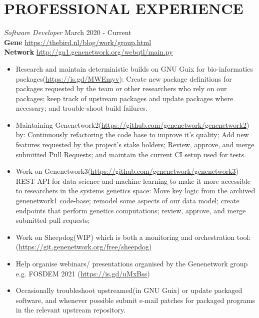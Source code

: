 \documentclass[margin, line]{res} %
\begin{document}


\section{PROFESSIONAL EXPERIENCE}

{\sl Software Developer} \hfill March 2020 - Current \\
\textbf{Gene} \hfill \url{https://thebird.nl/blog/work/group.html} \\
\textbf{Network} \hfill \url{http://gn1.genenetwork.org/webqtl/main.py}

\begin{itemize} \itemsep -2pt
\item Research and maintain deterministic builds on GNU Guix for
  bio-informatics packages(\url{https://is.gd/MWEmyv}): Create new
  package definitions for packages requested by the team or other
  researchers who rely on our packages; keep track of upstream
  packages and update packages where necessary; and trouble-shoot
  build failures.
\item Maintaining
  Genenetwork2(\url{https://github.com/genenetwork/genenetwork2}) by:
  Continuously refactoring the code base to improve it's quality; Add
  new features requested by the project's stake holders; Review,
  approve, and merge submitted Pull Requests; and maintain the current
  CI setup used for tests.
\item Work on
  Genenetwork3(\url{https://github.com/genenetwork/genenetwork3}) REST
  API for data science and machine learning to make it more accessible
  to researchers in the systems genetics space: Move key logic from
  the archived genenetwork1 code-base; remodel some aspects of our data
  model; create endpoints that perform genetics computations; review,
  approve, and merge submitted pull requests;
\item Work on Sheepdog(WIP) which is both a monitoring and
  orchestration tool:
  (\url{https://git.genenetwork.org/free/sheepdog})
\item Help organise webinars/ presentations organised by the
  Genenetwork group e.g. FOSDEM 2021 (\url{https://is.gd/uMxBss})
\item Occasionally troubleshoot upstreamed(in GNU Guix) or update
  packaged software, and whenever possible submit e-mail patches for
  packaged programs in the relevant upstream repository.
\end{itemize}
\end{document}
